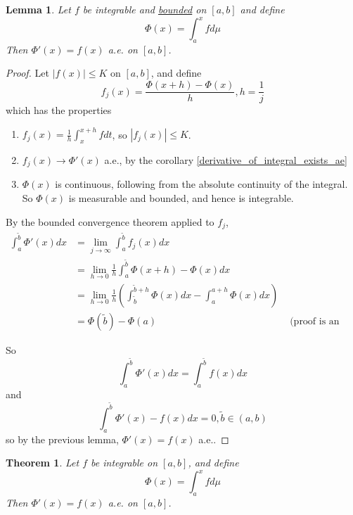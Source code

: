\documentclass[11pt,a4paper]{report}
\newtheorem{lemma}[theorem]{Lemma}
\theoremstyle{plain}
\newtheorem{thm}{Theorem}[section]
\theoremstyle{definition}
\theoremstyle{remark}
\newcommand{\abs}[1]{\left| #1 \right|}
\begin{document}
\begin{lemma}
  Let $f$ be integrable and \underline{bounded} on $[a, b]$ and define
  $$ \Phi(x) = \int_a^x f d\mu $$
  Then $\Phi'(x) = f(x)$ a.e. on $[a, b]$.
\end{lemma}

\begin{proof}
  Let $\abs{f(x)} \le K$ on $[a, b]$, and define
  $$ f_j(x) = \frac{\Phi(x+h) - \Phi(x)}{h}, h = \frac{1}{j} $$
  which has the properties
  \begin{enumerate}
     \item $f_j(x) = \frac{1}{h} \int_x^{x+h} f dt$, so $\abs{f_j(x)} \le K$.
     \item $f_j(x) \rightarrow \Phi'(x)$ a.e., by the corollary \ref{derivative_of_integral_exists_ae}
     \item $\Phi(x)$ is continuous, following from the absolute continuity of the integral. So $\Phi(x)$ is measurable and bounded, and hence is integrable.
  \end{enumerate}

  By the bounded convergence theorem applied to $f_j$, 
  \begin{align*}
      \int_a^{\tilde b} \Phi'(x) dx &= \lim_{j \to \infty} \int_a^{\tilde b} f_j(x) dx \\
      &= \lim_{h \to 0} \frac{1}{h} \int_a^{\tilde b} \Phi(x + h) - \Phi(x) dx \\
      &= \lim_{h \to 0} \frac{1}{h} \left(\int_{\tilde b}^{\tilde b + h} \Phi(x) dx - \int_a^{a+h} \Phi(x) dx \right) \\
      &= \Phi(\tilde b) - \Phi(a) &\text{ (proof is an exercise)} 
  \end{align*}

  So
  $$ \int_a^{\tilde b} \Phi'(x) dx = \int_a^{\tilde b} f(x) dx $$
  and
  $$ \int_a^{\tilde b} \Phi'(x) - f(x) dx = 0, \tilde b \in (a, b) $$
  so by the previous lemma, $\Phi'(x) = f(x)$ a.e..
\end{proof}

\begin{thm}
  Let $f$ be integrable on $[a, b]$, and define
    $$ \Phi(x) = \int_a^x f d\mu$$
  Then $\Phi'(x) = f(x)$ a.e. on $[a, b]$.
\end{thm}
\end{document}
